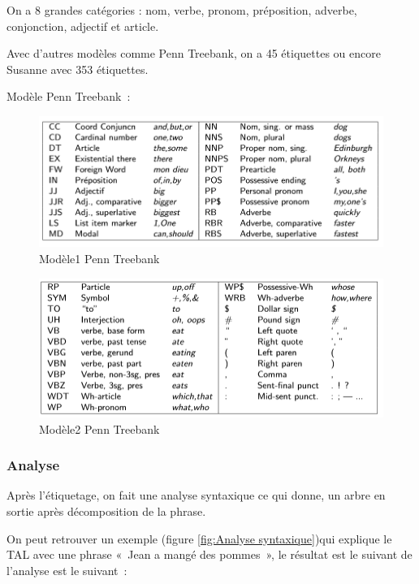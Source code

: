 On a 8 grandes catégories : nom, verbe, pronom, préposition, adverbe, conjonction, adjectif et article. 
\vspace{1em}

Avec d’autres modèles comme Penn Treebank, on a 45 étiquettes ou encore Susanne avec 353 étiquettes.
\vspace{1em}

Modèle Penn Treebank : \cite{ref9}
\vspace{1em}


\begin{figure}[H]
	\centering
		\includegraphics[width = \textwidth]{modele1.png}
	\caption{Modèle1 Penn Treebank}
	\label{fig:Modèle1 Penn Treebank}
\end{figure}

\begin{figure}[H]
	\centering
		\includegraphics[width = \textwidth]{modele2.png}
	\caption{Modèle2 Penn Treebank}
	\label{fig:Modèle2 Penn Treebank}
\end{figure}

\subsubsection{Analyse}

Après l’étiquetage, on fait une analyse syntaxique ce qui donne, un arbre en sortie après décomposition de la phrase.
\vspace{1em}

On peut retrouver un exemple (figure \ref{fig:Analyse syntaxique})qui explique le TAL \cite{ref10} avec une phrase « Jean a mangé des pommes », le résultat est le suivant de l’analyse est le suivant :
\vspace{1em}

